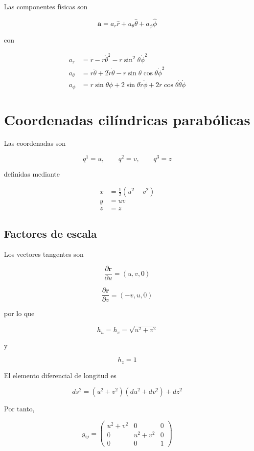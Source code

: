 \documentclass[12pt]{article}
\begin{document}
Las componentes físicas son

\[
\boxed{
\mathbf a=
a_r\hat r
+
a_\theta\hat\theta
+
a_\phi\hat\phi
}
\]

con

\begin{align}
a_r&=
\ddot r
-r\dot\theta^2
-r\sin^2\theta\dot\phi^2
\\
a_\theta&=
r\ddot\theta
+2\dot r\dot\theta
-r\sin\theta\cos\theta\dot\phi^2
\\
a_\phi&=
r\sin\theta\ddot\phi
+2\sin\theta\dot r\dot\phi
+2r\cos\theta\dot\theta\dot\phi
\end{align}

\section{Coordenadas cilíndricas parabólicas}

Las coordenadas son

\[
q^1=u,
\qquad
q^2=v,
\qquad
q^3=z
\]

definidas mediante

\begin{align}
x&=
\frac12(u^2-v^2)
\\
y&=
uv
\\
z&=z
\end{align}

\subsection{Factores de escala}

Los vectores tangentes son

\[
\frac{\partial\mathbf r}{\partial u}
=
(u,v,0)
\]

\[
\frac{\partial\mathbf r}{\partial v}
=
(-v,u,0)
\]

por lo que

\[
h_u=h_v=
\sqrt{u^2+v^2}
\]

y

\[
h_z=1
\]

El elemento diferencial de longitud es

\[
ds^2=
(u^2+v^2)
(du^2+dv^2)
+dz^2
\]

Por tanto,

\[
g_{ij}
=
\begin{pmatrix}
u^2+v^2&0&0\\
0&u^2+v^2&0\\
0&0&1
\end{pmatrix}
\]
\end{document}
